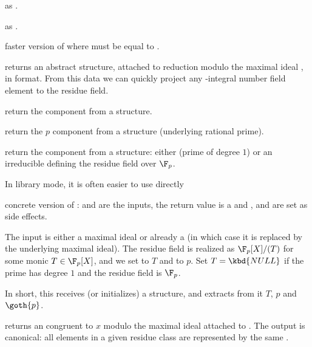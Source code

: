 as .

as .

faster version of  where
 must be equal to .


 returns an abstract 
structure, attached to reduction modulo the maximal ideal , in
 format. From this data we can quickly project any
-integral number field element to the residue field.

 return the  component from a 
structure.

 return the $p$ component from a 
structure (underlying rational prime).

 return the  component from a 
structure: either  (prime of degree $1$) or an irreducible
 defining the residue field over $\F_p$.

In library mode, it is often easier to use directly

 concrete
version of :  and  are the inputs, the
return value is a  and ,  and  are set
as side effects.

The input  is either a maximal ideal or already a  (in
which case it is replaced by the underlying maximal ideal). The residue field
is realized as $\F_p[X]/(T)$ for some monic $T\in\F_p[X]$, and we set
 to $T$ and  to $p$. Set $T = \kbd{NULL}$ if the prime has
degree $1$ and the residue field is $\F_p$.

In short, this receives (or initializes) a  structure, and
extracts from it $T$, $p$ and $\goth{p}$.

 returns an  congruent
to $x$ modulo the maximal ideal attached to . The output is
canonical: all elements in a given residue class are represented by the same
.

